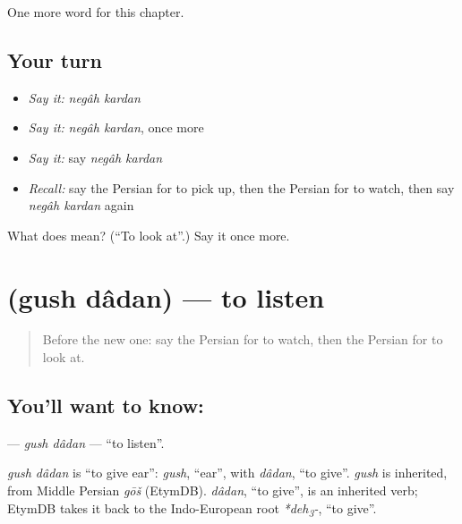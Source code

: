 \begin{grammarlens}[title={What you've built}]
One more word for this chapter.
\end{grammarlens}

\subsection*{Your turn}
\begin{itemize}
\raggedright
  \item \emph{Say it:} \emph{negâh kardan}
  \item \emph{Say it:} \emph{negâh kardan}, once more
  \item \emph{Say it:} say \emph{negâh kardan}
  \item \emph{Recall:} say the Persian for to pick up, then the Persian for to watch, then say \emph{negâh kardan} again
\end{itemize}

\begin{tcolorbox}[breakable,colback=teal!4,colframe=teal!35!black,title={Before you move on}]
What does   mean? (\textquotedblleft{}To look at\textquotedblright{}.) Say it once more.
\end{tcolorbox}
\section[\texorpdfstring{\fa{گوش} \fa{دادن} (gush dâdan)}{گوش دادن (gush dâdan)}]{  (gush dâdan) — to listen}

\label{lesson:FA-C179-gush-dadan}



\begin{quote}
Before the new one: say the Persian for to watch, then the Persian for to look at.
\end{quote}

\subsection*{You'll want to know:  }
\textbf{ } — \emph{gush dâdan} — \textquotedblleft{}to listen\textquotedblright{}.

\begin{cousinweb}
\emph{gush dâdan} is \textquotedblleft{}to give ear\textquotedblright{}: \emph{gush}, \textquotedblleft{}ear\textquotedblright{}, with \emph{dâdan}, \textquotedblleft{}to give\textquotedblright{}. \emph{gush} is inherited, from Middle Persian \emph{gōš} (EtymDB). \emph{dâdan}, \textquotedblleft{}to give\textquotedblright{}, is an inherited verb; EtymDB takes it back to the Indo-European root \emph{*deh\textsubscript{3}-}, \textquotedblleft{}to give\textquotedblright{}.
\end{cousinweb}

